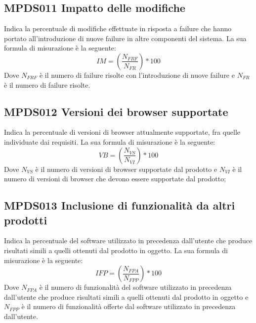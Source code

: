 \documentclass[NormeDiProgetto.tex]{subfiles}
\begin{document}
\subsection{MPDS011 Impatto delle modifiche} Indica la percentuale di modifiche effettuate in risposta a failure che hanno portato all'introduzione di nuove failure in altre componenti del sistema. La sua formula di misurazione è la seguente: \[IM=(\frac{N_{FRF}}{N_{FR}})*100\] Dove $ N_{FRF} $ è il numero di failure risolte con l'introduzione di nuove failure e $ N_{FR} $ è il numero di failure risolte.

\subsection{MPDS012 Versioni dei browser supportate} Indica la percentuale di versioni di browser attualmente supportate, fra quelle individuate dai requisiti. La sua formula di misurazione è la seguente: \[VB=(\frac{N_{VS}}{N_{VI}})*100\] Dove $ N_{VS} $ è il numero di versioni di browser supportate dal prodotto e $ N_{VI} $ è il numero di versioni di browser che devono essere supportate dal prodotto;
\subsection{MPDS013 Inclusione di funzionalità da altri prodotti} Indica la percentuale del software utilizzato in precedenza dall'utente che produce risultati simili a quelli ottenuti dal prodotto in oggetto. La sua formula di misurazione è la seguente: \[IFP=(\frac{N_{FPA}}{N_{FPP}})*100\] Dove $ N_{FPA} $ è il numero di funzionalità del software utilizzato in precedenza dall'utente che produce risultati simili a quelli ottenuti dal prodotto in oggetto e $ N_{FPP} $ è il numero di funzionalità offerte dal software utilizzato in precedenza dall'utente. 
\end{document}
